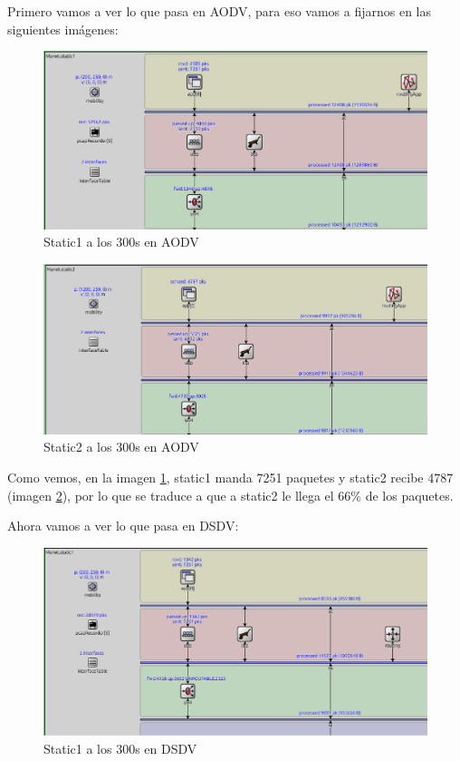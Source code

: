 Primero vamos a ver lo que pasa en AODV, para eso vamos a fijarnos en las siguientes imágenes:

\begin{figure}[H]
    \centering
    \includegraphics[width=155mm, scale=0.75]{imaxes/aodv_dsdv/ejercicio3_4_static1_aodv.png}
    \caption{Static1 a los 300s en AODV}
    \label{fig:ejer3_4_1}
\end{figure}

\begin{figure}[H]
    \centering
    \includegraphics[width=155mm, scale=0.75]{imaxes/aodv_dsdv/ejercicio3_4_static2_aodv.png}
    \caption{Static2 a los 300s en AODV}
    \label{fig:ejer3_4_2}
\end{figure}

Como vemos, en la imagen \ref{fig:ejer3_4_1}, static1 manda 7251 paquetes y static2 recibe 4787 (imagen \ref{fig:ejer3_4_2}), por lo que se traduce a que a static2 le llega el 66\% de los paquetes.

Ahora vamos a ver lo que pasa en DSDV:

\begin{figure}[H]
    \centering
    \includegraphics[width=155mm, scale=0.75]{imaxes/aodv_dsdv/ejercicio3_4_static1_dsdv.png}
    \caption{Static1 a los 300s en DSDV}
    \label{fig:ejer3_4_3}
\end{figure}

